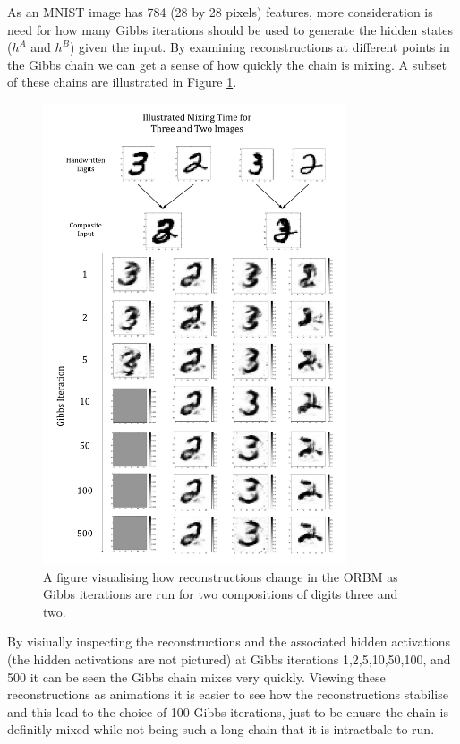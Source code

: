   As an MNIST image has 784 (28 by 28 pixels) features, more consideration is need for how many Gibbs iterations should be used to generate the hidden states ($h^A$ and $h^B$) given the input. By examining reconstructions at different points in the Gibbs chain we can get a sense of how quickly the chain is mixing. A subset of these chains are illustrated in Figure \ref{F:MNIST-Mixing-Time}.
  \begin{figure}[htb]
    \begin{center}
      \includegraphics[width=0.8\textwidth]{Assets/results/Mixing-Results.png}
    \end{center}
    \caption{A figure visualising how reconstructions change in the ORBM as Gibbs iterations are run for two compositions of digits three and two.}
    \label{F:MNIST-Mixing-Time}
  \end{figure}
  By visiually inspecting the reconstructions and the associated hidden activations (the hidden activations are not pictured) at Gibbs iterations 1,2,5,10,50,100, and 500 it can be seen the Gibbs chain mixes very quickly. Viewing these reconstructions as animations it is easier to see how the reconstructions stabilise and this lead to the choice of 100 Gibbs iterations, just to be enusre the chain is definitly mixed while not being such a long chain that it is intractbale to run.

